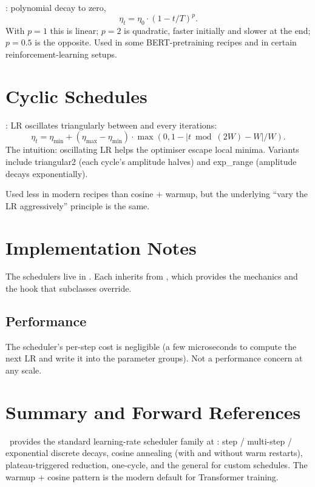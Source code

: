 :
polynomial decay to zero,
\[
  \eta_t = \eta_0 \cdot (1 - t/T)^p.
\]
With $p = 1$ this is linear; $p = 2$ is quadratic, faster
initially and slower at the end; $p = 0.5$ is the opposite.
Used in some BERT-pretraining recipes and in certain
reinforcement-learning setups.

\section{Cyclic Schedules}
\label{sec:lr_schedulers:cyclic}

:
LR oscillates triangularly between  and
 every  iterations:
\[
  \eta_t = \eta_{\min} + (\eta_{\max} - \eta_{\min}) \cdot
  \max(0, 1 - |t \bmod (2W) - W| / W).
\]
The intuition: oscillating LR helps the optimiser escape local
minima. Variants include triangular2 (each cycle's amplitude
halves) and exp\_range (amplitude decays exponentially).

Used less in modern recipes than cosine + warmup, but the
underlying ``vary the LR aggressively'' principle is the same.

\section{Implementation Notes}
\label{sec:lr_schedulers:impl_notes}

The schedulers live in . Each
inherits from , which provides the
 mechanics and the  hook that
subclasses override.

\subsection{Performance}
\label{ssec:lr_schedulers:perf}

The scheduler's per-step cost is negligible (a few microseconds
to compute the next LR and write it into the parameter groups).
Not a performance concern at any scale.

\section{Summary and Forward References}
\label{sec:lr_schedulers:summary}

\Lucid\ provides the standard learning-rate scheduler family at
: step / multi-step / exponential
discrete decays, cosine annealing (with and without warm
restarts), plateau-triggered reduction, one-cycle, and the
general  for custom schedules. The warmup + cosine
pattern is the modern default for Transformer training.

